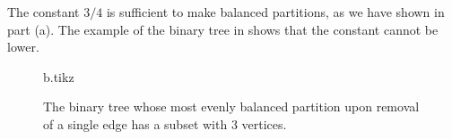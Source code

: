 \subproblem
The constant $3/4$ is sufficient to make balanced partitions, as we have shown in part (a).
The example of the binary tree in  shows that the constant cannot be lower.
\begin{figure}[htb]
    {b.tikz}
    \caption{The binary tree whose most evenly balanced partition upon removal of a single edge has a subset with 3 vertices.} \label{fig:B-3b}
\end{figure}
